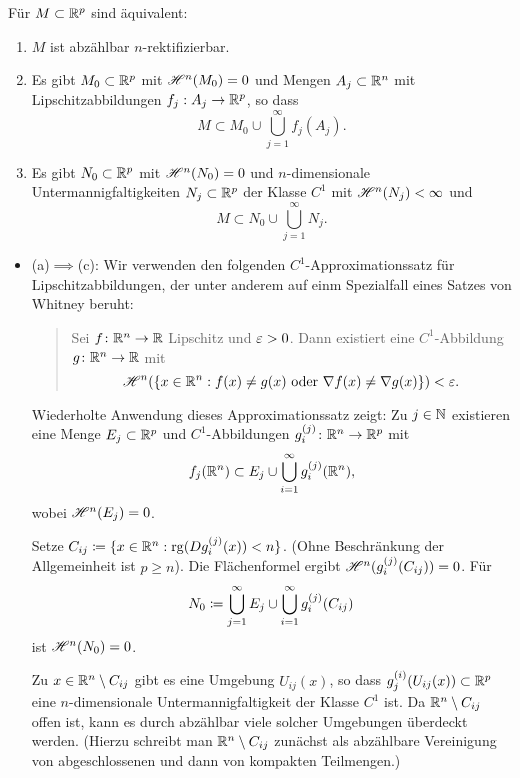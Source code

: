 \documentclass[a4paper,twoside,DIV15,BCOR12mm]{scrbook}
\newcommand{\HM}{\H}
\begin{document}
\begin{proposition}
Für $M\subset \mathbb{R}^p$ sind äquivalent:
\begin{enumerate}[\quad(a)]
\item $M$ ist abzählbar $n$-rektifizierbar.
\item Es gibt $M_0\subset \mathbb{R}^p$ mit $\HM^n(M_0)=0$ und Mengen $A_j\subset \mathbb{R}^n$ mit Lipschitzabbildungen $f_j:A_j \to \mathbb{R}^p$, so dass 
\[
M\subset M_0 \cup \bigcup_{j=1}^\infty f_j(A_j).
\]
\item Es gibt $N_0\subset \mathbb{R}^p$ mit $\HM^n(N_0)=0$ und $n$-dimensionale Untermannigfaltigkeiten $N_j\subset \mathbb{R}^p$ der Klasse $C^1$ mit $\HM^n(N_j)<\infty$ und 
\[
M\subset N_0 \cup \bigcup_{j=1}^\infty N_j.
\]
\end{enumerate}
\end{proposition}

\begin{beweis}
\begin{itemize}
\item (a)$\implies$(c): Wir verwenden den folgenden $C^1$-Approximationssatz für Lipschitzabbildungen, der 
unter anderem auf einm Spezialfall eines Satzes von Whitney beruht:

\begin{quotation}
\noindent Sei $f\colon\mathbb{R}^n \to \mathbb{R}$ Lipschitz und $\varepsilon>0$. Dann existiert eine $C^1$-Abbildung $g\colon\mathbb{R}^n\to \mathbb{R}$ mit
\[
\HM^n(\{x\in \MdR^n: f(x) \ne g(x) \text{ oder } \nabla f(x) \ne \nabla g(x)\})<\ep.
\]
\end{quotation}

Wiederholte Anwendung dieses Approximationssatz zeigt: Zu $j\in\mathbb{N}$ existieren eine Menge $E_j\subset \mathbb{R}^p$ und $C^1$-Abbildungen $g_i^{(j)}\colon \mathbb{R}^n\to \mathbb{R}^p$ mit
\[
f_j(\mathbb{R}^n) \subset E_j \cup \bigcup_{i=1}^\infty g_i^{(j)} (\mathbb{R}^n),
\]
wobei $\HM^n(E_j)=0$.

Setze $C_{ij}\da \{x\in \MdR^n : \operatorname{rg}(Dg_i^{(j)} (x)) < n \}$. (Ohne Beschränkung der Allgemeinheit ist $p\ge n$). Die Flächenformel ergibt $\HM^n(g_i^{(j)}(C_{ij})) = 0$. Für 
$$N_0 \da \bigcup_{j=1}^\infty E_j \cup \bigcup_{i=1}^\infty g_i^{(j)}(C_{ij})$$ 
ist $\HM^n(N_0)=0$.

Zu $x\in \mathbb{R}^n\setminus C_{ij}$ gibt es eine Umgebung $U_{ij}(x)$, so dass $g_j^{(i)}(U_{ij}(x))\subset \mathbb{R}^p$ eine $n$-dimensionale Untermannigfaltigkeit der Klasse $C^1$ ist. Da $\mathbb{R}^n\setminus C_{ij}$ offen ist, kann es durch abzählbar viele solcher Umgebungen überdeckt werden. (Hierzu schreibt man $\mathbb{R}^n\setminus C_{ij}$ 
zunächst als abzählbare Vereinigung von abgeschlossenen und dann von kompakten Teilmengen.)
\end{itemize}
\end{beweis}
\end{document}
